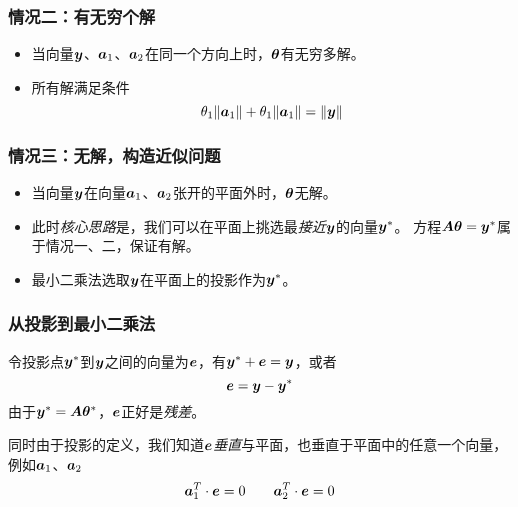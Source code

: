 \documentclass[14pt]{beamer}
\begin{document}
    \begin{frame}
        \frametitle{情况二：有无穷个解}
        \begin{itemize}
            \item 当向量$\bm{y}$、$\Va_1$、$\Va_2$在同一个方向上时，$\bm{\theta}$有无穷多解。
            \item 所有解满足条件
            \begin{equation}
                \theta_1\|\Va_1\|+\theta_1\|\Va_1\|=\|\Vy\|
            \end{equation}
        \end{itemize}
    \end{frame}

    \begin{frame}
        \frametitle{情况三：无解，构造近似问题}
        \begin{itemize}
            \item 当向量$\bm{y}$在向量$\Va_1$、$\Va_2$张开的平面外时，$\bm{\theta}$无解。
            \item 此时\emph{核心思路}是，我们可以在平面上挑选最\emph{接近}$\bm{y}$的向量$\bm{y}^*$。
            方程$\bm{A}\bm{\theta}=\bm{y}^*$属于情况一、二，保证有解。
            \item 最小二乘法选取$\bm{y}$在平面上的投影作为$\bm{y}^*$。
        \end{itemize}
    \end{frame}

    \begin{frame}
        \frametitle{从投影到最小二乘法}
        令投影点$\bm{y}^*$到$\bm{y}$之间的向量为$\bm{e}$，有$\bm{y}^*+\bm{e}=\bm{y}$，或者
        \begin{equation}
            \bm{e}=\bm{y}-\bm{y}^*
        \end{equation}
        由于$\bm{y}^*=\bm{A}\bm{\theta}^*$，$\bm{e}$正好是\emph{残差}。

        同时由于投影的定义，我们知道$\bm{e}$\emph{垂直}与平面，也垂直于平面中的任意一个向量，
        例如$\Va_1$、$\Va_2$
        \begin{equation}
            \Va_1^T\cdot\Ve=0 \qquad \Va_2^T\cdot\Ve=0
        \end{equation}
    \end{frame}
    
\end{document}

